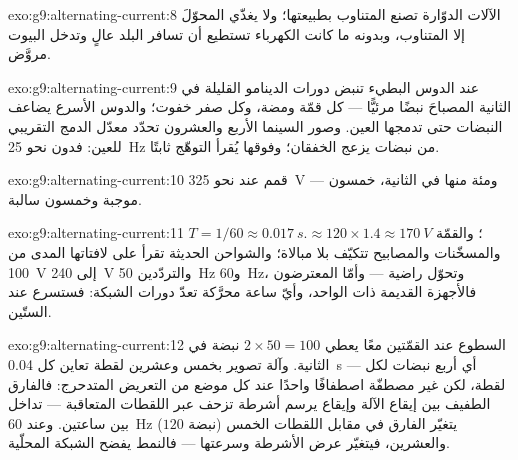 \begin{solution}{exo:g9:alternating-current:8}
الآلات الدوّارة تصنع المتناوب بطبيعتها؛ ولا يغذّي المحوّلَ
إلا المتناوب، وبدونه ما كانت الكهرباء تستطيع أن تسافر البلد
 عالٍ وتدخل البيوت  مروَّض.
\end{solution}

\begin{solution}{exo:g9:alternating-current:9}
عند الدوس البطيء تنبض دورات الدينامو القليلة في الثانية
المصباحَ نبضًا مرئيًّا --- كل قمّة ومضة، وكل صفر خفوت؛ والدوس
الأسرع يضاعف النبضات حتى تدمجها العين. وصور السينما الأربع
والعشرون تحدّد معدّل الدمج التقريبي للعين: فدون نحو
\qty{25}{Hz} من نبضات  يزعج الخفقان؛ وفوقها يُقرأ
التوهّج ثابتًا.
\end{solution}

\begin{solution}{exo:g9:alternating-current:10}
قمم عند نحو \qty{325}{V} --- ومئة منها في الثانية، خمسون
موجبة وخمسون سالبة.
\end{solution}

\begin{solution}{exo:g9:alternating-current:11}
$T = 1/60 \approx \qty{0.017}{s}$؛ والقمّة $\approx 120 \times
1.4 \approx \qty{170}{V}$. والمسخّنات والمصابيح تتكيّف بلا
مبالاة؛ والشواحن الحديثة تقرأ على لافتاتها المدى من
\qty{100}{V} إلى \qty{240}{V} والتردّدين \qty{50}{Hz}
و\qty{60}{Hz}، وتحوّل راضية --- وأمّا المعترضون
فالأجهزة القديمة ذات  الواحد، وأيّ ساعة محرَّكة تعدّ
دورات الشبكة: فستسرع عند الستّين.
\end{solution}

\begin{solution}{exo:g9:alternating-current:12}
السطوع عند القمّتين معًا يعطي $2 \times 50 = 100$ نبضة في
الثانية. وآلة تصوير بخمس وعشرين لقطة تعاين كل \qty{0.04}{s}
--- أي أربع نبضات لكل لقطة، لكن غير مصطفّة اصطفافًا واحدًا عند
كل موضع من التعريض المتدحرج: فالفارق الطفيف بين إيقاع الآلة
وإيقاع  يرسم أشرطة تزحف عبر اللقطات المتعاقبة ---
تداخل بين ساعتين. وعند \qty{60}{Hz} ($120$ نبضة) يتغيّر
الفارق في مقابل اللقطات الخمس والعشرين، فيتغيّر عرض الأشرطة
وسرعتها --- فالنمط يفضح الشبكة المحلّية.
\end{solution}


